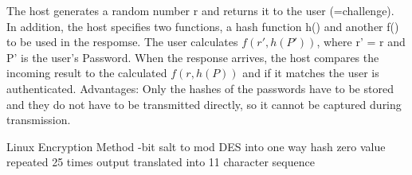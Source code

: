 \documentclass[../CIT288SecurityResearchNotebook.tex]{subfiles}
\begin{document}

The host generates a random number r and returns it to the user (=challenge). In
addition, the host specifies two functions, a hash function h() and another f() to be
used in the respomse. The user calculates $f(r', h(P'))$, where r' = r and P' is the
user's Password. When the response arrives, the host compares the incoming result to
the calculated $f(r, h(P))$ and if it matches the user is authenticated. Advantages:
Only  the hashes of the passwords have to be stored and they do not have to be
transmitted directly, so it cannot be captured during transmission.

\begin{outline}
  \1 Linux Encryption Method
    -bit salt to mod DES into one way hash
    \2 zero value repeated 25 times
    \2 output translated into 11 character sequence
\end{outline}
\end{document}
